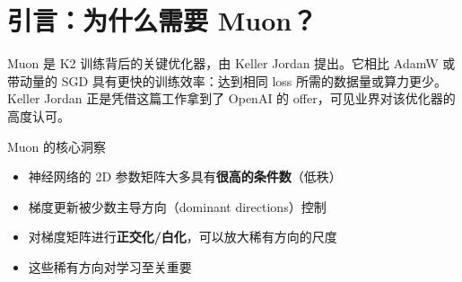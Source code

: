 \section{引言：为什么需要 Muon？}

Muon 是 K2 训练背后的关键优化器，由 Keller Jordan 提出。它相比 AdamW 或带动量的 SGD 具有更快的训练效率：达到相同 loss 所需的数据量或算力更少。Keller Jordan 正是凭借这篇工作拿到了 OpenAI 的 offer，可见业界对该优化器的高度认可。

\begin{importantbox}{Muon 的核心洞察}
\begin{itemize}
  \item 神经网络的 2D 参数矩阵大多具有\textbf{很高的条件数}（低秩）
  \item 梯度更新被少数主导方向（dominant directions）控制
  \item 对梯度矩阵进行\textbf{正交化/白化}，可以放大稀有方向的尺度
  \item 这些稀有方向对学习至关重要
\end{itemize}
\end{importantbox}

